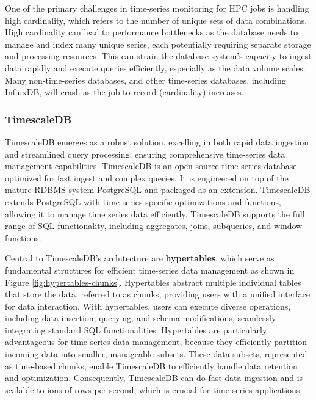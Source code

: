 One of the primary challenges in time-series monitoring for HPC jobs is handling high cardinality, which refers to the number of unique sets of data combinations. High cardinality can lead to performance bottlenecks as the database needs to manage and index many unique series, each potentially requiring separate storage and processing resources. This can strain the database system's capacity to ingest data rapidly and execute queries efficiently, especially as the data volume scales. Many non-time-series databases, and other time-series databases, including InfluxDB, will crash as the job to record (cardinality) increases.

\subsubsection{TimescaleDB}

TimescaleDB \cite{timescaledb} emerges as a robust solution, excelling in both rapid data ingestion and streamlined query processing, ensuring comprehensive time-series data management capabilities. TimescaleDB is an open-source time-series database optimized for fast ingest and complex queries. It is engineered on top of the mature RDBMS system PostgreSQL and packaged as an extension. TimescaleDB extends PostgreSQL with time-series-specific optimizations and functions, allowing it to manage time series data efficiently. TimescaleDB supports the full range of SQL functionality, including aggregates, joins, subqueries, and window functions.

Central to TimescaleDB's architecture are \textbf{hypertables}, which serve as fundamental structures for efficient time-series data management as shown in Figure \ref{fig:hypertables-chunks}. Hypertables abstract multiple individual tables that store the data, referred to as chunks, providing users with a unified interface for data interaction. With hypertables, users can execute diverse operations, including data insertion, querying, and schema modifications, seamlessly integrating standard SQL functionalities. Hypertables are particularly advantageous for time-series data management, because they efficiently partition incoming data into smaller, manageable subsets. These data subsets, represented as time-based chunks, enable TimescaleDB to efficiently handle data retention and optimization. Consequently, TimescaleDB can do fast data ingestion and is scalable to ions of rows per second, which is crucial for time-series applications.

